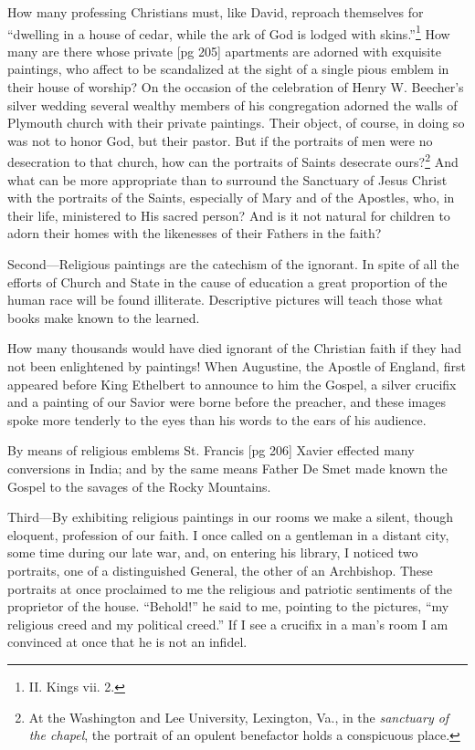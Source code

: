 How many professing Christians must, like
David, reproach themselves for “dwelling in a
house of cedar, while the ark of God is lodged
with skins.”\footnote{II. Kings vii.
2.} How many are there whose private
[pg 205]
apartments are adorned with exquisite paintings,
who affect to be scandalized at the sight of
a single pious emblem in their house of worship?
On the occasion of the celebration of Henry W.
Beecher's silver wedding several wealthy members
of his congregation adorned the walls of Plymouth
church with their private paintings. Their
object, of course, in doing so was not to honor
God, but their pastor. But if the portraits of
men were no desecration to that church, how can
the portraits of Saints desecrate ours?\footnote{At
the Washington and Lee University, Lexington, Va., in
the \emph{sanctuary of the chapel}, the portrait of an opulent benefactor
holds a conspicuous place.} And
what can be more appropriate than to surround
the Sanctuary of Jesus Christ with the portraits
of the Saints, especially of Mary and of the Apostles,
who, in their life, ministered to His sacred
person? And is it not natural for children to
adorn their homes with the likenesses of their
Fathers in the faith?

Second—Religious paintings are the catechism
of the ignorant. In spite of all the efforts of
Church and State in the cause of education a
great proportion of the human race will be found
illiterate. Descriptive pictures will teach those
what books make known to the learned.

How many thousands would have died ignorant
of the Christian faith if they had not been enlightened
by paintings! When Augustine, the
Apostle of England, first appeared before King
Ethelbert to announce to him the Gospel, a silver
crucifix and a painting of our Savior were
borne before the preacher, and these images spoke
more tenderly to the eyes than his words to the
ears of his audience.

By means of religious emblems St. Francis
[pg 206]
Xavier effected many conversions in India; and
by the same means Father De Smet made known
the Gospel to the savages of the Rocky Mountains.

Third—By exhibiting religious paintings in our
rooms we make a silent, though eloquent, profession
of our faith. I once called on a gentleman
in a distant city, some time during our late war,
and, on entering his library, I noticed two portraits,
one of a distinguished General, the other
of an Archbishop. These portraits at once proclaimed
to me the religious and patriotic sentiments
of the proprietor of the house. “Behold!”
he said to me, pointing to the pictures, “my religious
creed and my political creed.” If I see
a crucifix in a man's room I am convinced at
once that he is not an infidel.

